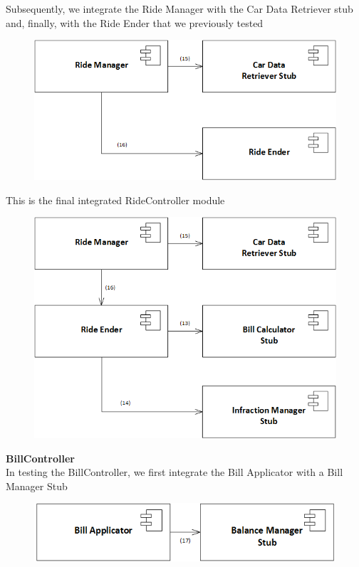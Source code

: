 \documentclass{article}
\begin{document}
Subsequently, we integrate the Ride Manager with the Car Data Retriever stub and, finally, with the Ride Ender that we previously tested
\begin{figure}[H]
\includegraphics[scale=0.5]{RideController/RideController2}
\centering
\end{figure}
This is the final integrated RideController module
\begin{figure}[H]
\includegraphics[scale=0.5]{RideController/RideControllerIntegration}
\centering
\end{figure}
\textbf{BillController}
\\
In testing the BillController, we first integrate the Bill Applicator with a Bill Manager Stub
\begin{figure}[H]
\includegraphics[scale=0.5]{BillController/BillController1}
\centering
\end{figure}
\end{document}
